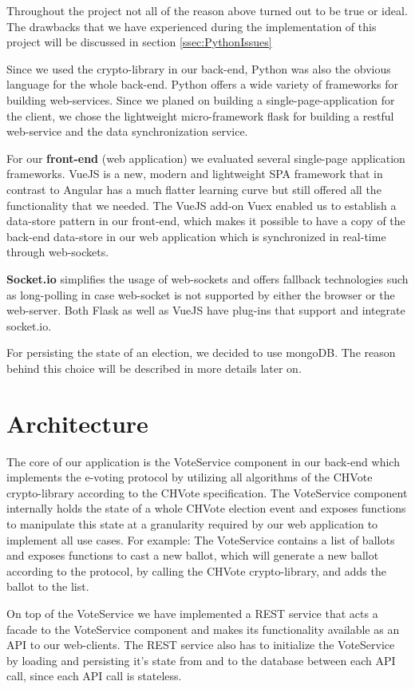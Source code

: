 Throughout the project not all of the reason above turned out to be true or ideal. The drawbacks that we have experienced during the implementation of this project will be discussed in section \ref{ssec:PythonIssues}

Since we used the crypto-library in our back-end, Python was also the obvious language for the whole back-end. Python offers a wide variety of frameworks for building web-services. Since we planed on building a single-page-application for the client, we chose the lightweight micro-framework flask for building a restful web-service and the data synchronization service.

For our \textbf{front-end} (web application) we evaluated several single-page application frameworks. VueJS is a new, modern and lightweight SPA framework that in contrast to Angular has a much flatter learning curve but still offered all the functionality that we needed. The VueJS add-on Vuex enabled us to establish a data-store pattern in our front-end, which makes it possible to have a copy of the back-end data-store in our web application which is synchronized in real-time through web-sockets.

\textbf{Socket.io} simplifies the usage of web-sockets and offers fallback technologies such as long-polling in case web-socket is not supported by either the browser or the web-server. Both Flask as well as VueJS have plug-ins that support and integrate socket.io.

For persisting the state of an election, we decided to use mongoDB. The reason behind this choice will be described in more details later on.

\section{Architecture}
The core of our application is the VoteService component in our back-end which implements the e-voting protocol by utilizing all algorithms of the CHVote crypto-library according to the CHVote specification. The VoteService component internally holds the state of a whole CHVote election event and exposes functions to manipulate this state at a granularity required by our web application to implement all use cases. For example: The VoteService contains a list of ballots and exposes functions to cast a new ballot, which will generate a new ballot according to the protocol, by calling the CHVote crypto-library, and adds the ballot to the list.

On top of the VoteService we have implemented a REST service that acts a facade to the VoteService component and makes its functionality available as an API to our web-clients. The REST service also has to initialize the VoteService by loading and persisting it's state from and to the database between each API call, since each API call is stateless.

